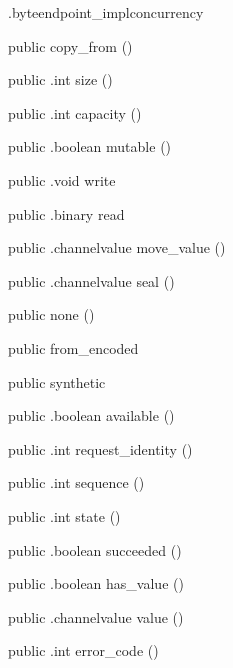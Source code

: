\begin{CrexxClass}{.byteendpoint\_impl}{concurrency}
\begin{Members}
    \Factory
      {public}
      {copy\_from}
      {()}

    \Method
      {public}
      {.int}
      {size}
      {()}

    \Method
      {public}
      {.int}
      {capacity}
      {()}

    \Method
      {public}
      {.boolean}
      {mutable}
      {()}

    \Method
      {public}
      {.void}
      {write}
      {}

    \Method
      {public}
      {.binary}
      {read}
      {}

    \Method
      {public}
      {.channelvalue}
      {move\_value}
      {()}

    \Method
      {public}
      {.channelvalue}
      {seal}
      {()}

    \Factory
      {public}
      {none}
      {()}

    \Factory
      {public}
      {from\_encoded}
      {}

    \Factory
      {public}
      {synthetic}
      {}

    \Method
      {public}
      {.boolean}
      {available}
      {()}

    \Method
      {public}
      {.int}
      {request\_identity}
      {()}

    \Method
      {public}
      {.int}
      {sequence}
      {()}

    \Method
      {public}
      {.int}
      {state}
      {()}

    \Method
      {public}
      {.boolean}
      {succeeded}
      {()}

    \Method
      {public}
      {.boolean}
      {has\_value}
      {()}

    \Method
      {public}
      {.channelvalue}
      {value}
      {()}

    \Method
      {public}
      {.int}
      {error\_code}
      {()}


\end{Members}
\end{CrexxClass}
